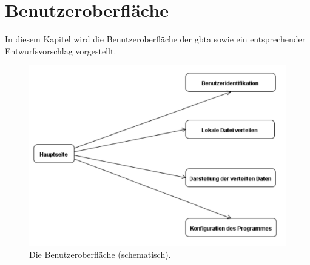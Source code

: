 \section{Benutzeroberfläche}
 In diesem Kapitel wird die Benutzeroberfläche der \gls{gbta} sowie ein 
 entsprechender Entwurfsvorschlag vorgestellt.

\begin{figure}[ht]
	\begin{center}
	\includegraphics[scale=0.8]{GUIZentral}	
	\end{center}
	\caption{Die Benutzeroberfläche (schematisch).}
\end{figure}

